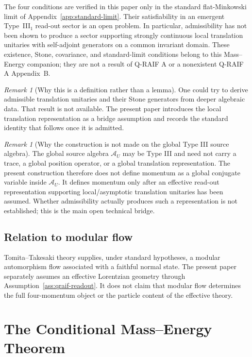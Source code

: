 \documentclass[12pt,a4paper]{article}
\theoremstyle{definition}
\theoremstyle{remark}
\newtheorem{remark}[theorem]{Remark}
\newcommand{\AU}{\mathcal{A}_U}
\begin{document}
The four conditions are verified in this paper only in the standard flat-Minkowski limit of Appendix~\ref{app:standard-limit}.  Their satisfiability in an emergent Type~III$_1$ read-out sector is an open problem.  In particular, admissibility has not been shown to produce a sector supporting strongly continuous local translation unitaries with self-adjoint generators on a common invariant domain.  These existence, Stone, covariance, and standard-limit conditions belong to this Mass--Energy companion; they are not a result of Q-RAIF A or a nonexistent Q-RAIF A Appendix~B.

\begin{remark}[Why this is a definition rather than a lemma]
One could try to derive admissible translation unitaries and their Stone generators from deeper algebraic data.  That result is not available.  The present paper introduces the local translation representation as a bridge assumption and records the standard identity that follows once it is admitted.
\end{remark}

\begin{remark}[Why the construction is not made on the global Type III source algebra]
\label{rem:typeIII}
The global source algebra $\AU$ may be Type III and need not carry a trace, a global position operator, or a global translation representation. The present construction therefore does not define momentum as a global conjugate variable inside $\AU$. It defines momentum only after an effective read-out representation supporting local/asymptotic translation unitaries has been assumed.  Whether admissibility actually produces such a representation is not established; this is the main open technical bridge.
\end{remark}

\subsection{Relation to modular flow}

Tomita--Takesaki theory supplies, under standard hypotheses, a modular automorphism flow associated with a faithful normal state.  The present paper separately assumes an effective Lorentzian geometry through Assumption~\ref{ass:qraif-readout}. It does not claim that modular flow determines the full four-momentum object or the particle content of the effective theory.

\section{The Conditional Mass--Energy Theorem}
\label{sec:theorem}
\end{document}
